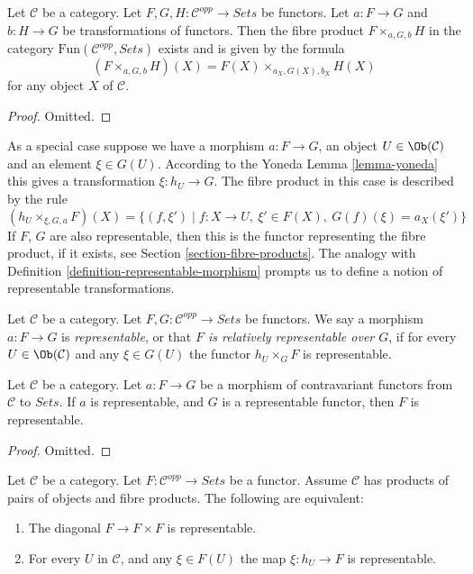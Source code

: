 \begin{lemma}
\label{lemma-fibre-product-presheaves}
Let $\mathcal{C}$ be a category.
Let $F, G, H : \mathcal{C}^{opp} \to \textit{Sets}$
be functors. Let $a : F \to G$ and $b : H \to G$ be
transformations of functors. Then the fibre product
$F \times_{a, G, b} H$ in the category
$\text{Fun}(\mathcal{C}^{opp}, \textit{Sets})$
exists and is given by the formula
$$
(F \times_{a, G, b} H)(X) =
F(X) \times_{a_X, G(X), b_X} H(X)
$$
for any object $X$ of $\mathcal{C}$.
\end{lemma}

\begin{proof}
Omitted.
\end{proof}

\noindent
As a special case suppose we have a morphism
$a : F \to G$, an object $U \in \Ob(\mathcal{C})$
and an element $\xi \in G(U)$. According to the Yoneda
Lemma \ref{lemma-yoneda} this gives a transformation
$\xi : h_U \to G$. The fibre product in this case
is described by the rule
$$
(h_U \times_{\xi, G, a} F)(X) =
\{ (f, \xi') \mid f : X \to U, \ \xi' \in F(X), \ G(f)(\xi) = a_X(\xi')\}
$$
If $F$, $G$ are also representable, then this is the functor representing the
fibre product, if it exists, see Section \ref{section-fibre-products}.
The analogy with Definition \ref{definition-representable-morphism}
prompts us to define a notion
of representable transformations.

\begin{definition}
\label{definition-representable-map-presheaves}
Let $\mathcal{C}$ be a category.
Let $F, G : \mathcal{C}^{opp} \to \textit{Sets}$
be functors. We say a morphism $a : F \to G$ is
{\it representable}, or that {\it $F$ is relatively representable
over $G$}, if for every $U \in \Ob(\mathcal{C})$
and any $\xi \in G(U)$ the functor
$h_U \times_G F$ is representable.
\end{definition}

\begin{lemma}
\label{lemma-representable-over-representable}
Let $\mathcal{C}$ be a category.
Let $a : F \to G$ be a morphism of contravariant functors
from $\mathcal{C}$ to $\textit{Sets}$. If $a$ is representable,
and $G$ is a representable functor, then $F$ is representable.
\end{lemma}

\begin{proof}
Omitted.
\end{proof}

\begin{lemma}
\label{lemma-representable-diagonal}
Let $\mathcal{C}$ be a category.
Let $F : \mathcal{C}^{opp} \to \textit{Sets}$ be a functor.
Assume $\mathcal{C}$ has products of pairs of objects and fibre products.
The following are equivalent:
\begin{enumerate}
\item The diagonal $F \to F \times F$ is representable.
\item For every $U$ in $\mathcal{C}$,
and any $\xi \in F(U)$ the map $\xi : h_U \to F$ is representable.
\end{enumerate}
\end{lemma}

